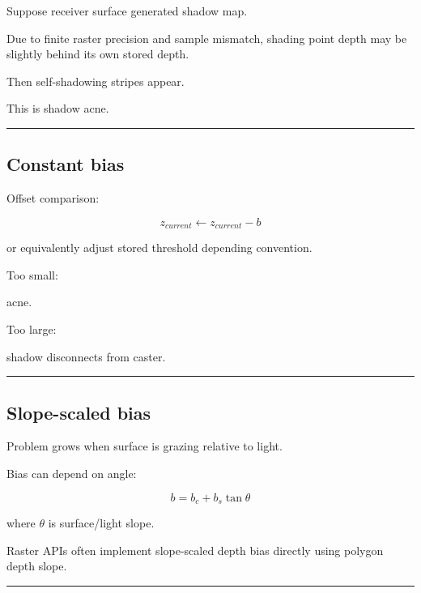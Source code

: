 \hypertarget{04-visual-computing-ii-ch040-shadow-acne}{}

Suppose receiver surface generated shadow map.

Due to finite raster precision and sample mismatch, shading point depth may be slightly behind its own stored depth.

Then self-shadowing stripes appear.

This is shadow acne.

\begin{center}\rule{0.5\linewidth}{0.5pt}\end{center}

\subsection{Constant bias}\label{04-visual-computing-ii-ch040-constant-bias}

\hypertarget{04-visual-computing-ii-ch040-constant-bias}{}

Offset comparison:

\[
z_{current}
\leftarrow
z_{current}-b
\]

or equivalently adjust stored threshold depending convention.

Too small:

acne.

Too large:

shadow disconnects from caster.

\begin{center}\rule{0.5\linewidth}{0.5pt}\end{center}

\subsection{Slope-scaled bias}\label{04-visual-computing-ii-ch040-slope-scaled-bias}

\hypertarget{04-visual-computing-ii-ch040-slope-scaled-bias}{}

Problem grows when surface is grazing relative to light.

Bias can depend on angle:

\[
\boxed{
b=
b_c+
b_s\tan\theta
}
\]

where \(\theta\) is surface/light slope.

Raster APIs often implement slope-scaled depth bias directly using polygon depth slope.

\begin{center}\rule{0.5\linewidth}{0.5pt}\end{center}

